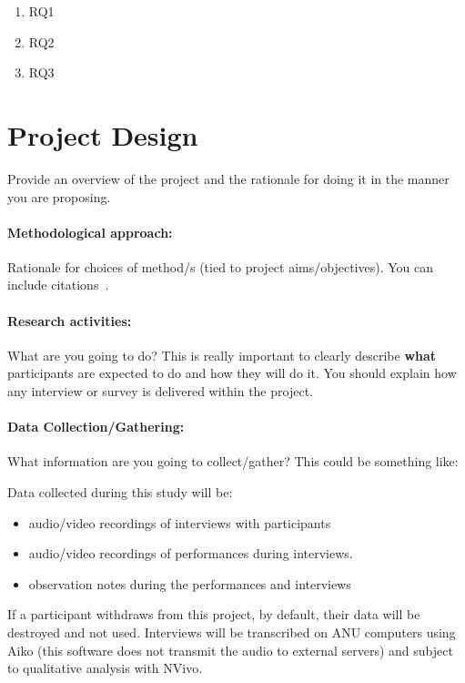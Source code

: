 \documentclass[11pt, a4paper, oneside]{article}
\begin{document}
\begin{enumerate}
    \item RQ1
    \item RQ2
    \item RQ3
\end{enumerate}

\section{Project Design}

Provide an overview of the project and the rationale for doing it in the manner you are proposing.

\paragraph{Methodological approach:}

Rationale for choices of method/s (tied to project aims/objectives). You can include citations~\cite{caine_sample_size:2016}.

\paragraph{Research activities:}

What are you going to do? This is really important to clearly describe \textbf{what} participants are expected to do and how they will do it. You should explain how any interview or survey is delivered within the project.

\paragraph{Data Collection/Gathering:} 

What information are you going to collect/gather? This could be something like:

Data collected during this study will be: 
\begin{itemize}
\item audio/video recordings of interviews with participants 
\item audio/video recordings of performances during interviews. 
\item observation notes during the performances and interviews
\end{itemize}
If a participant withdraws from this project, by default, their data will be destroyed and not used.
Interviews will be transcribed on ANU computers using Aiko (this software does not transmit the audio to external servers) and subject to qualitative analysis with NVivo.


\end{document}
